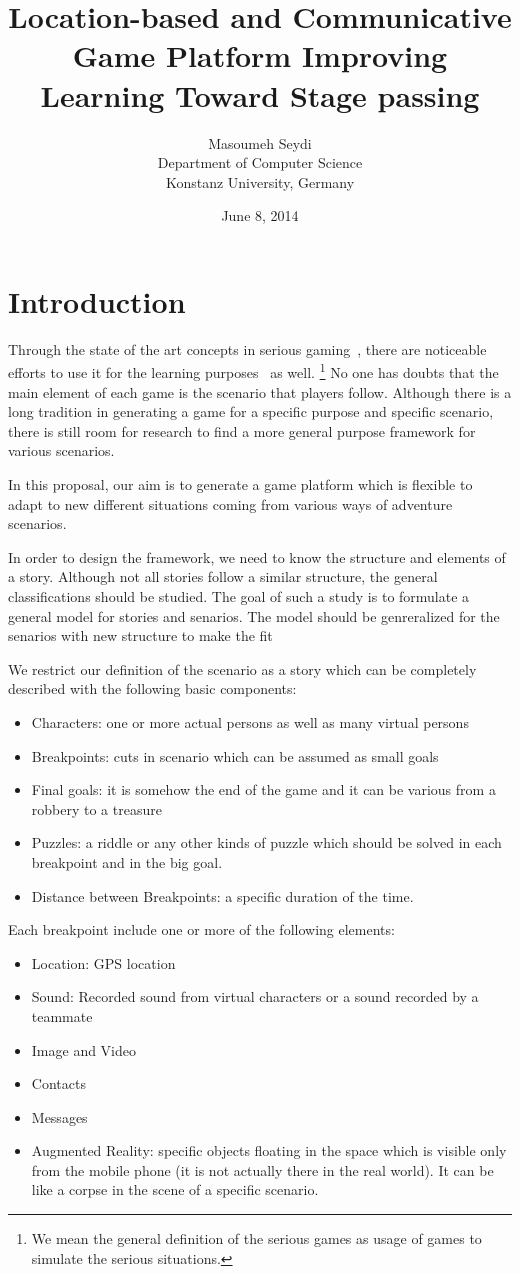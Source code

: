 \documentclass[conference]{IEEEtran}
\title{Location-based and Communicative Game Platform Improving Learning
Toward Stage passing}
\date{June 8, 2014}
\author{Masoumeh Seydi\\ Department of Computer Science\\
       Konstanz University, Germany}
\begin{document}
\maketitle

\section{Introduction}
Through the state of the art concepts in serious gaming~\cite{sergame1,sergame2}, 
there are noticeable efforts to use it for the learning purposes~\cite{sergame3} as well.
\footnote{We mean the general definition of the serious games as 
usage of games to simulate the serious situations.}
No one has doubts that the main element of each game is 
the scenario that players follow.
Although there is a long tradition in generating a game
for a specific purpose and specific scenario, 
there is still room for research 
to find a more general purpose framework for various scenarios.

In this proposal, our aim is to generate a game platform 
which is flexible to adapt to new different situations coming
from various ways of adventure scenarios. 

In order to design the framework, we need to know the structure and 
elements of a story. Although not all stories follow a similar structure,
the general classifications should be studied. The goal of such a study is to 
formulate a general model for stories and senarios. The model should be genreralized
for the senarios with new structure to make the fit  

We restrict our definition of the scenario as a story which
can be completely described with the following basic components:
\begin{itemize}
\item Characters: one or more actual persons as well as many virtual persons
\item Breakpoints: cuts in scenario which can be assumed as small goals 
\item Final goals: it is somehow the end of the game and 
it can be various from a robbery to a treasure
\item Puzzles: a riddle or any other kinds of puzzle which should be solved in each 
      breakpoint and in the big goal.
\item Distance between Breakpoints: a specific duration of the time.
\end{itemize}

Each breakpoint include one or more of the following elements:
\begin{itemize}
\item Location: GPS location
\item Sound: Recorded sound from virtual characters or a sound
recorded by a teammate
\item Image and Video
\item Contacts
\item Messages
\item Augmented Reality: specific objects floating in the space which is 
visible only from the mobile phone (it is not actually there in the real world).
It can be like a corpse in the scene of a specific scenario.
\end{itemize}
\end{document}

